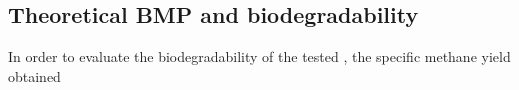 \subsection{Theoretical BMP and biodegradability}
In order to evaluate the biodegradability of the tested , the specific methane yield obtained 
